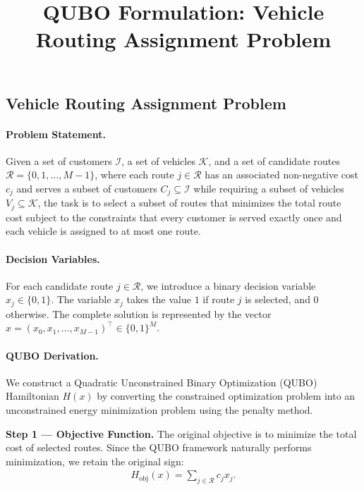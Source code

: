 \documentclass[12pt]{article}
\title{QUBO Formulation: Vehicle Routing Assignment Problem}
\date{}
\begin{document}
\maketitle

\subsection*{Vehicle Routing Assignment Problem}

\paragraph{Problem Statement.}
Given a set of customers $\mathcal{I}$, a set of vehicles $\mathcal{K}$, and a set of candidate routes $\mathcal{R} = \{0, 1, \dots, M-1\}$, where each route $j \in \mathcal{R}$ has an associated non-negative cost $c_j$ and serves a subset of customers $C_j \subseteq \mathcal{I}$ while requiring a subset of vehicles $V_j \subseteq \mathcal{K}$, the task is to select a subset of routes that minimizes the total route cost subject to the constraints that every customer is served exactly once and each vehicle is assigned to at most one route.

\paragraph{Decision Variables.}
For each candidate route $j \in \mathcal{R}$, we introduce a binary decision variable $x_j \in \{0, 1\}$. The variable $x_j$ takes the value $1$ if route $j$ is selected, and $0$ otherwise. The complete solution is represented by the vector $x = (x_0, x_1, \dots, x_{M-1})^\top \in \{0, 1\}^M$.

\paragraph{QUBO Derivation.}
We construct a Quadratic Unconstrained Binary Optimization (QUBO) Hamiltonian $H(x)$ by converting the constrained optimization problem into an unconstrained energy minimization problem using the penalty method.

\textbf{Step 1 --- Objective Function.}
The original objective is to minimize the total cost of selected routes. Since the QUBO framework naturally performs minimization, we retain the original sign:
\begin{align}
  H_{\text{obj}}(x) = \sum_{j \in \mathcal{R}} c_j x_j.
\end{align}
\end{document}
